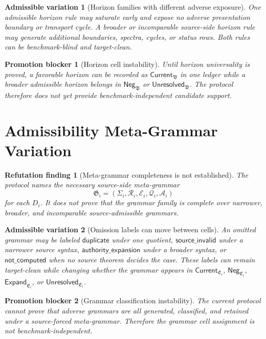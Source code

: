 \documentclass[11pt]{article}
\newcommand{\HorizonFam}{\mathfrak{B}}
\newcommand{\EnumFam}{\mathfrak{E}}
\newcommand{\MetaG}{\mathfrak{G}}
\newcommand{\Current}{\mathsf{Current}}
\newcommand{\Neg}{\mathsf{Neg}}
\newcommand{\Expand}{\mathsf{Expand}}
\newcommand{\Unres}{\mathsf{Unresolved}}
\newtheorem{finding}{Refutation finding}
\newtheorem{variation}{Admissible variation}
\newtheorem{blocker}{Promotion blocker}
\begin{document}
\begin{variation}[Horizon families with different adverse exposure]
One admissible horizon rule may saturate early and expose no adverse
presentation boundary or transport cycle. A broader or incomparable
source-side horizon rule may generate additional boundaries, spectra,
cycles, or status rows. Both rules can be benchmark-blind and target-clean.
\end{variation}

\begin{blocker}[Horizon cell instability]
Until horizon universality is proved, a favorable horizon can be recorded as
\(\Current_{\HorizonFam}\) in one ledger while a broader admissible horizon
belongs in \(\Neg_{\HorizonFam}\) or \(\Unres_{\HorizonFam}\). The protocol
therefore does not yet provide benchmark-independent candidate support.
\end{blocker}

\section{Admissibility Meta-Grammar Variation}

\begin{finding}[Meta-grammar completeness is not established]
The protocol names the necessary source-side meta-grammar
\[
\MetaG_i=(\Sigma_i,\mathcal{R}_i,\mathcal{E}_i,\mathcal{Q}_i,\mathcal{A}_i)
\]
for each \(D_i\). It does not prove that the grammar family is complete over
narrower, broader, and incomparable source-admissible grammars.
\end{finding}

\begin{variation}[Omission labels can move between cells]
An omitted grammar may be labeled \(\mathsf{duplicate}\) under one quotient,
\(\mathsf{source\_invalid}\) under a narrower source syntax,
\(\mathsf{authority\_expansion}\) under a broader syntax, or
\(\mathsf{not\_computed}\) when no source theorem decides the case. These
labels can remain target-clean while changing whether the grammar appears in
\(\Current_{\EnumFam_i}\), \(\Neg_{\EnumFam_i}\),
\(\Expand_{\EnumFam_i}\), or \(\Unres_{\EnumFam_i}\).
\end{variation}

\begin{blocker}[Grammar classification instability]
The current protocol cannot prove that adverse grammars are all generated,
classified, and retained under a source-forced meta-grammar. Therefore the
grammar cell assignment is not benchmark-independent.
\end{blocker}
\end{document}
